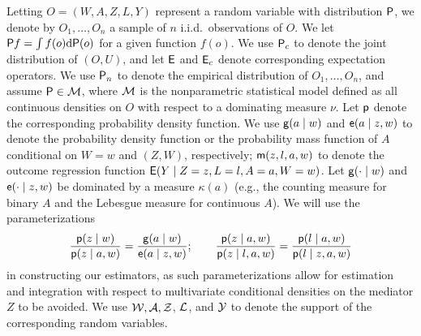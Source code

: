 Letting $O = (W, A, Z, L, Y)$ represent a random variable with distribution
$\P$, we denote by $O_1, \ldots, O_n$ a sample of $n$ i.i.d.~observations of
$O$. We let $\P f = \int f(o)\dd \P(o)$ for a given function $f(o)$. We use
$\P_c$ to denote the joint distribution of $(O,U)$, and let $\E$ and $\E_c$
denote corresponding expectation operators. We use $\Pn$ to denote the empirical
distribution of $O_1, \ldots, O_n$, and assume $\P \in \M$, where $\M$ is the
nonparametric statistical model defined as all continuous densities on $O$ with
respect to a dominating measure $\nu$. Let $\p$ denote the corresponding
probability density function. We use $\g(a \mid w)$ and $\e(a \mid z, w)$ to
denote the probability density function or the probability mass function of $A$
conditional on $W = w$ and $(Z, W)$, respectively; $\m(z,l,a,w)$ to denote the
outcome regression function $\E(Y \mid Z = z,L=l,A = a,W = w)$. Let
$\g(\cdot\mid w)$ and $\e(\cdot\mid z,w)$ be dominated by a measure $\kappa(a)$
(e.g., the counting measure for binary $A$ and the Lebesgue measure for
continuous $A$). %
We will use the parameterizations
\begin{equation}
  \frac{\p(z\mid w)}{\p(z\mid a, w)} = \frac{\g(a\mid w)}{\e(a\mid z,w)};
    \quad\quad \frac{\p(z\mid a,w)}{\p(z\mid l,a,w)}=
    \frac{\p(l\mid a,w)}{\p(l\mid z,a,w)}\label{eq:parameterize}
\end{equation}
in constructing our estimators, as such parameterizations allow for estimation
and integration with respect to multivariate conditional densities on the
mediator $Z$ to be avoided. We use $\cal W, \cal A, \cal Z$, $\cal L$, and
$\cal Y$ to denote the support of the corresponding random variables.


